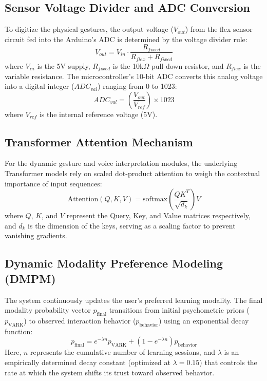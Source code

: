 \subsection{Sensor Voltage Divider and ADC Conversion}
To digitize the physical gestures, the output voltage ($V_{out}$) from the flex sensor circuit fed into the Arduino's ADC is determined by the voltage divider rule:
\begin{equation}
	V_{out} = V_{in} \cdot \frac{R_{fixed}}{R_{flex} + R_{fixed}}
\end{equation}
where $V_{in}$ is the 5V supply, $R_{fixed}$ is the 10k$\Omega$ pull-down resistor, and $R_{flex}$ is the variable resistance. The microcontroller's 10-bit ADC converts this analog voltage into a digital integer ($ADC_{val}$) ranging from 0 to 1023:
\begin{equation}
	ADC_{val} = \left( \frac{V_{out}}{V_{ref}} \right) \times 1023
\end{equation}
where $V_{ref}$ is the internal reference voltage (5V).

\subsection{Transformer Attention Mechanism}
For the dynamic gesture and voice interpretation modules, the underlying Transformer models rely on scaled dot-product attention to weigh the contextual importance of input sequences:
\begin{equation}
	\text{Attention}(Q, K, V) = \text{softmax} \left( \frac{QK^T}{\sqrt{d_k}} \right) V
\end{equation}
where $Q$, $K$, and $V$ represent the Query, Key, and Value matrices respectively, and $d_k$ is the dimension of the keys, serving as a scaling factor to prevent vanishing gradients.

\subsection{Dynamic Modality Preference Modeling (DMPM)}
The system continuously updates the user's preferred learning modality. The final modality probability vector $p_{\text{final}}$ transitions from initial psychometric priors ($p_{\text{VARK}}$) to observed interaction behavior ($p_{\text{behavior}}$) using an exponential decay function:
\begin{equation}
	p_{\text{final}} = e^{-\lambda n} p_{\text{VARK}} + \left(1 - e^{-\lambda n}\right) p_{\text{behavior}}
\end{equation}
Here, $n$ represents the cumulative number of learning sessions, and $\lambda$ is an empirically determined decay constant (optimized at $\lambda = 0.15$) that controls the rate at which the system shifts its trust toward observed behavior.

